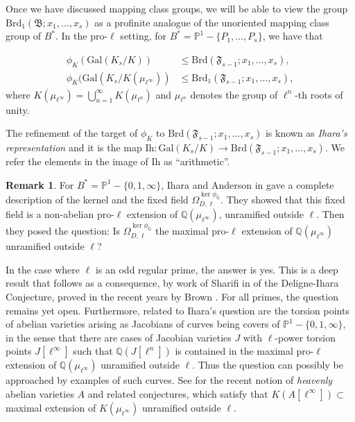 \documentclass[10pt]{amsart}
\theoremstyle{definition}
\newtheorem{remark}[theorem]{Remark}
\newcommand{\Q}{\mathbb{Q}}
\newcommand{\Gal}{{ \mathrm{Gal}}}
\begin{document}
Once we have discussed mapping class groups, we will be able to view the group $\mathrm{Brd}_1(\mathfrak{B};x_1, \ldots, x_s)$
as a profinite analogue of the unoriented mapping class group of $B^*$. 
In the pro-$\ell$ setting, for $B^* = \mathbb{P}^1-\{P_1,\ldots,P_s\}$, we have that

\begin{align*}
    \phi_K (\Gal(K_s /K))  &\leq \mathrm{Brd}(\mathfrak{F}_{s-1};x_1, \ldots, x_s), \\
    \phi_K (\Gal(K_s /K(\mu_{\ell^\infty})) &\leq \mathrm{Brd}_1(\mathfrak{F}_{s-1};x_1, \ldots, x_s),
\end{align*}
where $K(\mu_{\ell^{\infty}})=\bigcup\limits_{n=1}^\infty K(\mu_{\ell^n})$ and $\mu_{\ell^n}$ denotes the group of $\ell^n$-th roots of unity.

The refinement of the target of $\phi_K$ to $\mathrm{Brd}(\mathfrak{F}_{s-1};x_1, \ldots, x_s)$ is known as {\em Ihara's representation} and it is the map $\mathrm{Ih} \colon \Gal(K_s/K) \to \mathrm{Brd}(\mathfrak{F}_{s-1};x_1, \ldots, x_s)$. We refer the elements in the image of $\mathrm{Ih}$ as ``arithmetic''. 

\begin{remark}
    For $B^* = \mathbb{P}^1-\{0,1,\infty\}$, Ihara and Anderson in \cite{AndersonIhara88} gave a complete description of the kernel and the fixed field $\Omega_{D,\ell}^{\ker \phi_\Q}$. They showed that this fixed field is a non-abelian pro-$\ell$ extension of $\Q(\mu_{\ell^\infty})$, unramified outside $\ell$. Then they posed the question:
    Is $\Omega_{D,\ell}^{\ker \phi_\Q}$ the maximal pro-$\ell$ extension of $\Q(\mu_{\ell^\infty})$ unramified outside $\ell$? 

    In the case where $\ell$ is an odd regular prime, the answer is yes.  This is a deep result that follows as a consequence, by work of Sharifi in \cite{MR1935409} of the Deligne-Ihara Conjecture, proved in the recent years by Brown \cite{MR2993755}. For all primes, the question remains yet open. Furthermore, related to Ihara's question are the torsion points of abelian varieties arising as Jacobians of curves being covers of $\mathbb{P}^1-\{0,1,\infty\}$, in the sense that there are cases of Jacobian varieties $J$ with $\ell$-power torsion points $J[\ell^\infty]$ such that $\mathbb{Q}(J[\ell^n])$ is contained in the maximal pro-$\ell$ extension of $\mathbb{Q}(\mu_{\ell^\infty})$ unramified outside $\ell$. Thus the question can possibly be approached by examples of such curves. See \cite{MR2470396} \cite{MR3592515} for the recent notion of {\em heavenly} abelian varieties $A$ and related conjectures, which satisfy that $K(A[\ell^\infty]) \subset$ maximal extension of $K(\mu_{\ell^\infty})$ unramified outside $\ell$.
\end{remark}
\end{document}
